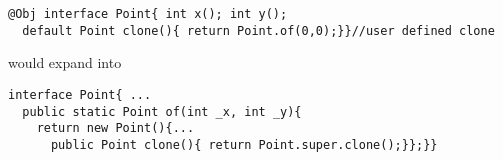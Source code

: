 \begin{lstlisting}
@Obj interface Point{ int x(); int y();
  default Point clone(){ return Point.of(0,0);}}//user defined clone
\end{lstlisting} 
would expand into 

\begin{lstlisting}
interface Point{ ...
  public static Point of(int _x, int _y){
    return new Point(){...
      public Point clone(){ return Point.super.clone();}};}}
\end{lstlisting} 
